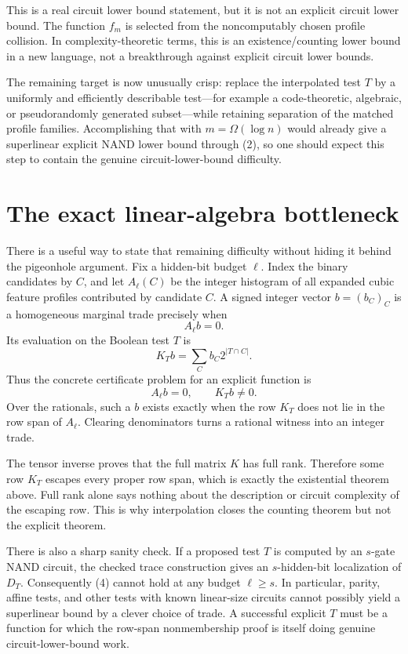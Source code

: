 \documentclass[11pt]{article}
\begin{document}
This is a real circuit lower bound statement, but it is not an explicit
circuit lower bound.  The function $f_m$ is selected from the noncomputably
chosen profile collision.  In complexity-theoretic terms, this is an
existence/counting lower bound in a new language, not a breakthrough against
explicit circuit lower bounds.

The remaining target is now unusually crisp: replace the interpolated test
$T$ by a uniformly and efficiently describable test---for example a
code-theoretic, algebraic, or pseudorandomly generated subset---while
retaining separation of the matched profile families.  Accomplishing that
with $m=\Omega(\log n)$ would already give a superlinear explicit NAND lower
bound through (2), so one should expect this step to contain the genuine
circuit-lower-bound difficulty.

\section{The exact linear-algebra bottleneck}

There is a useful way to state that remaining difficulty without hiding it
behind the pigeonhole argument.  Fix a hidden-bit budget $\ell$.  Index the
binary candidates by $C$, and let $A_\ell(C)$ be the integer histogram of all
expanded cubic feature profiles contributed by candidate $C$.  A signed
integer vector $b=(b_C)_C$ is a homogeneous marginal trade precisely when
\[
  A_\ell b=0.
\]
Its evaluation on the Boolean test $T$ is
\[
  K_Tb=\sum_C b_C2^{|T\cap C|}.
\]
Thus the concrete certificate problem for an explicit function is
\[
  A_\ell b=0,\qquad K_Tb\ne0.                 \tag{4}
\]
Over the rationals, such a $b$ exists exactly when the row $K_T$ does not lie
in the row span of $A_\ell$.  Clearing denominators turns a rational witness
into an integer trade.

The tensor inverse proves that the full matrix $K$ has full rank.  Therefore
some row $K_T$ escapes every proper row span, which is exactly the existential
theorem above.  Full rank alone says nothing about the description or circuit
complexity of the escaping row.  This is why interpolation closes the
counting theorem but not the explicit theorem.

There is also a sharp sanity check.  If a proposed test $T$ is computed by an
$s$-gate NAND circuit, the checked trace construction gives an $s$-hidden-bit
localization of $D_T$.  Consequently (4) cannot hold at any budget
$\ell\ge s$.  In particular, parity, affine tests, and other tests with known
linear-size circuits cannot possibly yield a superlinear bound by a clever
choice of trade.  A successful explicit $T$ must be a function for which the
row-span nonmembership proof is itself doing genuine circuit-lower-bound
work.
\end{document}
